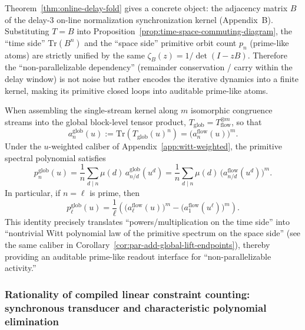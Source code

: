 \begin{remark}
Theorem~\ref{thm:online-delay-fold} gives a concrete object: the adjacency matrix $B$ of the delay-$3$ on-line normalization synchronization kernel (Appendix~B). Substituting $T=B$ into Proposition~\ref{prop:time-space-commuting-diagram}, the ``time side'' $\mathrm{Tr}(B^n)$ and the ``space side'' primitive orbit count $p_n$ (prime-like atoms) are strictly unified by the same $\zeta_B(z)=1/\det(I-zB)$.
Therefore the ``non-parallelizable dependency'' (remainder conservation / carry within the delay window) is not noise but rather encodes the iterative dynamics into a finite kernel, making its primitive closed loops into auditable prime-like atoms.
\end{remark}

\begin{remark}
When assembling the single-stream kernel along $m$ isomorphic congruence streams into the global block-level tensor product, $T_{\mathrm{glob}}=T_{\mathrm{flow}}^{\otimes m}$, so that
\[
a_n^{\mathrm{glob}}(u):=\mathrm{Tr}(T_{\mathrm{glob}}(u)^n)=\bigl(a_n^{\mathrm{flow}}(u)\bigr)^m.
\]
Under the $u$-weighted caliber of Appendix~\ref{app:witt-weighted}, the primitive spectral polynomial satisfies
\[
p_n^{\mathrm{glob}}(u)=\frac{1}{n}\sum_{d\mid n}\mu(d)\,a_{n/d}^{\mathrm{glob}}(u^d)
=\frac{1}{n}\sum_{d\mid n}\mu(d)\,\bigl(a_{n/d}^{\mathrm{flow}}(u^d)\bigr)^m.
\]
In particular, if $n=\ell$ is prime, then
\[
p_\ell^{\mathrm{glob}}(u)=\frac{1}{\ell}\left(\bigl(a_\ell^{\mathrm{flow}}(u)\bigr)^m-\bigl(a_1^{\mathrm{flow}}(u^\ell)\bigr)^m\right).
\]
This identity precisely translates ``powers/multiplication on the time side'' into ``nontrivial Witt polynomial law of the primitive spectrum on the space side'' (see the same caliber in Corollary~\ref{cor:par-add-global-lift-endpoints}), thereby providing an auditable prime-like readout interface for ``non-parallelizable activity.''
\end{remark}

\subsubsection{Rationality of compiled linear constraint counting: synchronous transducer and characteristic polynomial elimination}\label{subsec:compiled-linear-constraint-counting}

